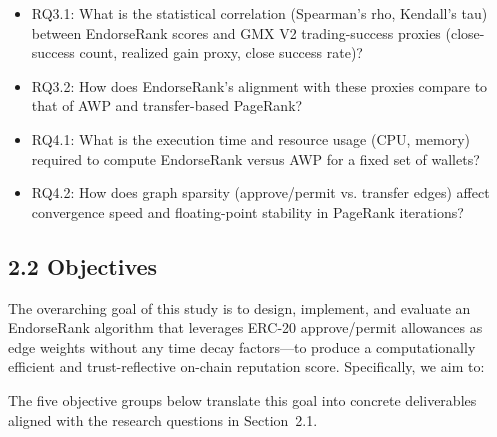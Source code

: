 \begin{itemize}
\item[\textendash] RQ3.1: What is the statistical correlation (Spearman's rho, Kendall's tau) between EndorseRank scores and GMX V2 trading-success proxies (close-success count, realized gain proxy, close success rate)?
\item[\textendash] RQ3.2: How does EndorseRank's alignment with these proxies compare to that of AWP and transfer-based PageRank?
\end{itemize}

\begin{itemize}
\item[\textendash] RQ4.1: What is the execution time and resource usage (CPU, memory) required to compute EndorseRank versus AWP for a fixed set of wallets?
\item[\textendash] RQ4.2: How does graph sparsity (approve/permit vs. transfer edges) affect convergence speed and floating-point stability in PageRank iterations?
\end{itemize}
\subsection*{2.2 Objectives}
\label{sec:objectives}

The overarching goal of this study is to design, implement, and evaluate an EndorseRank algorithm that leverages ERC-20 approve/permit allowances as edge weights without any time decay factors---to produce a computationally efficient and trust-reflective on-chain reputation score. Specifically, we aim to:


The five objective groups below translate this goal into concrete deliverables aligned with the research questions in Section~2.1.




